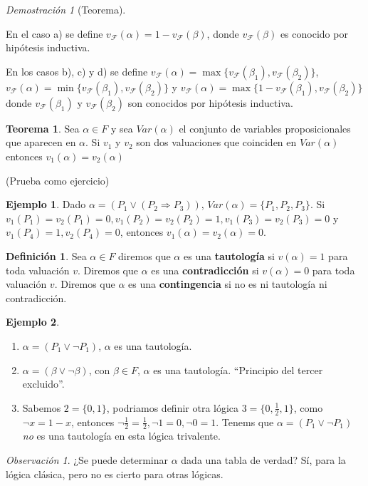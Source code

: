 \documentclass[a4paper,11pt]{article}
\theoremstyle{definition}
\newtheorem{defn}{Definición}[section]
\newtheorem{exap}{Ejemplo}[section]
\newtheorem{teor}{Teorema}[section]
\theoremstyle{remark}
\newtheorem*{remk}{Observación}
\newtheorem*{demo}{Demostración}
\def\FF{\mathcal{F}}
\begin{document}
\begin{demo}[Teorema]
\begin{enumerate}
En el caso a) se define $v_{\FF}(\alpha) = 1 - v_{\FF}(\beta)$, donde
$v_{\FF}(\beta)$ es conocido por hipótesis inductiva.

En los casos b), c) y d) se define $v_{\FF}(\alpha) = \max\{v_{\FF}(\beta_1), v_{\FF}(\beta_2)\}$,
$v_{\FF}(\alpha) = \min\{v_{\FF}(\beta_1), v_{\FF}(\beta_2)\}$ y
$v_{\FF}(\alpha) = \max\{1 - v_{\FF}(\beta_1), v_{\FF}(\beta_2)\}$ donde
$v_{\FF}(\beta_1)$ y $v_{\FF}(\beta_2)$ son conocidos por hipótesis inductiva.
\end{enumerate}
\end{demo}

\begin{teor}
Sea $\alpha \in F$ y sea $Var(\alpha)$ el conjunto de variables proposicionales que 
aparecen en $\alpha$. Si $v_1$ y $v_2$ son dos valuaciones que coinciden en $Var(\alpha)$
entonces $v_1(\alpha) = v_2(\alpha)$
\end{teor}

(Prueba como ejercicio)

\begin{exap}
Dado $\alpha = (P_1 \vee (P_2 \Rightarrow P_3))$, $Var(\alpha) = \{P_1, P_2, P_3\}$. 
Si $v_1(P_1) = v_2(P_1) = 0, v_1(P_2) = v_2(P_2) = 1, v_1(P_3) = v_2(P_3) = 0$
y $v_1(P_4) = 1, v_2(P_4) = 0$, entonces $v_1(\alpha) = v_2(\alpha) = 0$.
\end{exap}

\begin{defn}
Sea $\alpha \in F$ diremos que $\alpha$ es una \textbf{tautología} si $v(\alpha) = 1$
para toda valuación $v$. Diremos que $\alpha$ es una \textbf{contradicción} si 
$v(\alpha) = 0$ para toda valuación $v$. Diremos que $\alpha$ es una \textbf{contingencia}
si no es ni tautología ni contradicción.
\end{defn}

\begin{exap}
\begin{enumerate}
\item $\alpha = (P_1 \vee \neg P_1)$, $\alpha$ es una tautología.
\item $\alpha = (\beta \vee \neg \beta)$, con $\beta \in F$, $\alpha$ es una tautología. 
``Principio del tercer excluido''.
\item Sabemos $2 = \{0, 1\}$, podriamos definir otra lógica $3 = \{0, \frac{1}{2}, 1\}$,
como $\neg x = 1 - x$, entonces $\neg \frac{1}{2} = \frac{1}{2}, \neg 1 = 0, \neg 0 = 1$.
Tenems que $\alpha = (P_1 \vee \neg P_1)$ \emph{no} es una tautología en esta lógica trivalente.
\end{enumerate}
\end{exap}

\begin{remk}
¿Se puede determinar $\alpha$ dada una tabla de verdad? Sí, para la lógica clásica,
pero no es cierto para otras lógicas.
\end{remk}
\end{document}
